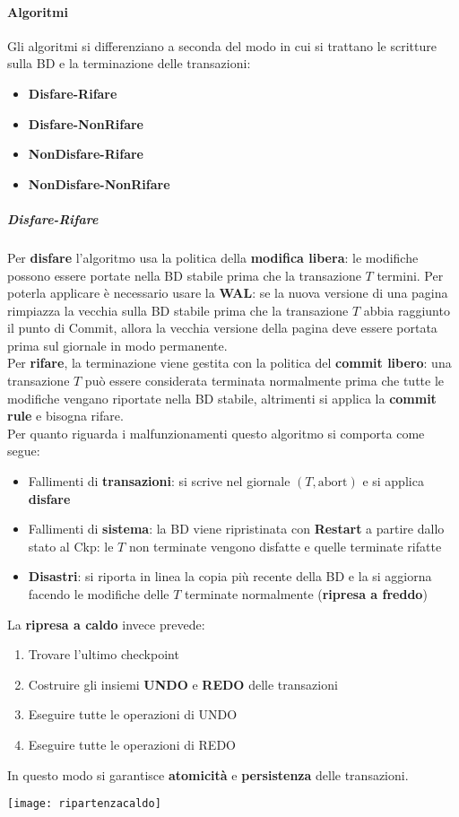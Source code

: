 \paragraph{Algoritmi}
Gli algoritmi si differenziano a seconda del modo in cui si trattano le scritture sulla BD e la terminazione delle transazioni:
\begin{itemize}
	\item \textbf{Disfare-Rifare}
	\item \textbf{Disfare-NonRifare}
	\item \textbf{NonDisfare-Rifare}
	\item \textbf{NonDisfare-NonRifare}
\end{itemize}
\subparagraph{Disfare-Rifare}
Per \textbf{disfare} l'algoritmo usa la politica della \textbf{modifica libera}: le modifiche possono essere portate nella BD stabile prima che la transazione $T$ termini. Per poterla applicare è necessario usare la \textbf{WAL}: se la nuova versione di una pagina rimpiazza la vecchia sulla BD stabile prima che la transazione $T$ abbia raggiunto il punto di Commit, allora la vecchia versione della pagina deve essere portata prima sul giornale in modo permanente.\\
Per \textbf{rifare}, la terminazione viene gestita con la politica del \textbf{commit libero}: una transazione $T$ può essere considerata terminata normalmente prima che tutte le modifiche vengano riportate nella BD stabile, altrimenti si applica la \textbf{commit rule} e bisogna rifare.\\
Per quanto riguarda i malfunzionamenti questo algoritmo si comporta come segue:
\begin{itemize}
	\item Fallimenti di \textbf{transazioni}: si scrive nel giornale $(T, \text{abort})$ e si applica \textbf{disfare}
	\item Fallimenti di \textbf{sistema}: la BD viene ripristinata con \textbf{Restart} a partire dallo stato al Ckp: le $T$ non terminate vengono disfatte e quelle terminate rifatte
	\item \textbf{Disastri}: si riporta in linea la copia più recente della BD e la si aggiorna facendo le modifiche delle $T$ terminate normalmente (\textbf{ripresa a freddo})
\end{itemize}
La \textbf{ripresa a caldo} invece prevede:
\begin{enumerate}
	\item Trovare l'ultimo checkpoint
	\item Costruire gli insiemi \textbf{UNDO} e \textbf{REDO} delle transazioni
	\item Eseguire tutte le operazioni di UNDO
	\item Eseguire tutte le operazioni di REDO
\end{enumerate}
In questo modo si garantisce \textbf{atomicità} e \textbf{persistenza} delle transazioni.
\begin{center}
	\texttt{[image: ripartenzacaldo]}
\end{center}
